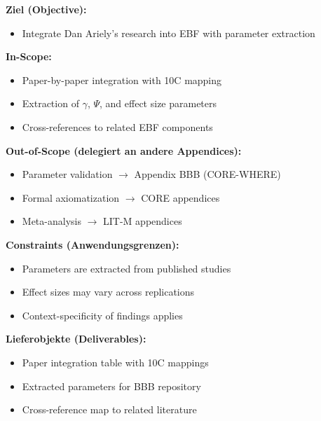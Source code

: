
\begin{tcolorbox}[
    colback=orange!5!white,
    colframe=orange!75!black,
    title={\textbf{Appendix Scope: Ziel / In-Scope / Out-of-Scope / Constraints}},
    fonttitle=\bfseries
]

\textbf{Ziel (Objective):}
\begin{itemize}[nosep]
    \item Integrate Dan Ariely's research into EBF with parameter extraction
\end{itemize}

\textbf{In-Scope:}
\begin{itemize}[nosep]
    \item Paper-by-paper integration with 10C mapping
    \item Extraction of $\gamma$, $\Psi$, and effect size parameters
    \item Cross-references to related EBF components
\end{itemize}

\textbf{Out-of-Scope (delegiert an andere Appendices):}
\begin{itemize}[nosep]
    \item Parameter validation $\rightarrow$ Appendix BBB (CORE-WHERE)
    \item Formal axiomatization $\rightarrow$ CORE appendices
    \item Meta-analysis $\rightarrow$ LIT-M appendices
\end{itemize}

\textbf{Constraints (Anwendungsgrenzen):}
\begin{itemize}[nosep]
    \item Parameters are extracted from published studies
    \item Effect sizes may vary across replications
    \item Context-specificity of findings applies
\end{itemize}

\textbf{Lieferobjekte (Deliverables):}
\begin{itemize}[nosep]
    \item Paper integration table with 10C mappings
    \item Extracted parameters for BBB repository
    \item Cross-reference map to related literature
\end{itemize}

\end{tcolorbox}

